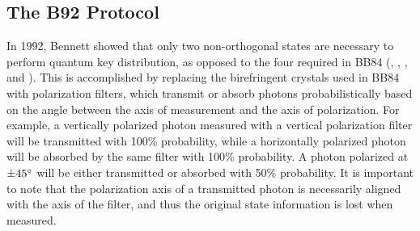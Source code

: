 \documentclass[conference]{IEEEtran}
\begin{document}
\subsection{The B92 Protocol}
In 1992, Bennett\cite{B92} showed that only two non-orthogonal states are necessary to perform quantum key distribution, as opposed to the four required in BB84 (\ket{\uparrow}, \ket{\rightarrow}, \ket{\nwarrow}, and \ket{\nearrow}). This is accomplished by replacing the birefringent crystals used in BB84 with polarization filters, which transmit or absorb photons probabilistically based on the angle between the axis of measurement and the axis of polarization. For example, a vertically polarized photon measured with a vertical polarization filter will be transmitted with 100\% probability, while a horizontally polarized photon will be absorbed by the same filter with 100\% probability. A photon polarized at $\pm45\degree$ will be either transmitted or absorbed with 50\% probability. It is important to note that the polarization axis of a transmitted photon is necessarily aligned with the axis of the filter, and thus the original state information is lost when measured.\\
\end{document}
